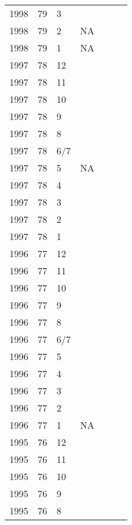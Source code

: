 \begin{longtable}{ |l|l|l|l|p{2.7cm}|l|p{2cm}| }
 1998 & 79 &     3 &         &  &  & \\
 1998 & 79 &     2 &     NA  &  &  & \\
 1998 & 79 &     1 &     NA  &  &  & \\
 1997 & 78 &    12 &         &  &  & \\
 1997 & 78 &    11 &         &  &  & \\
 1997 & 78 &    10 &         &  &  & \\
 1997 & 78 &     9 &         &  &  & \\
 1997 & 78 &     8 &         &  &  & \\
 1997 & 78 &   6/7 &         &  &  & \\
 1997 & 78 &     5 &     NA  &  &  & \\
 1997 & 78 &     4 &         &  &  & \\
 1997 & 78 &     3 &         &  &  & \\
 1997 & 78 &     2 &         &  &  & \\
 1997 & 78 &     1 &         &                &  & \\
 1996 & 77 &    12 &         &                &  & \\
 1996 & 77 &    11 &         &                &  & \\
 1996 & 77 &    10 &         &                &  & \\
 1996 & 77 &     9 &         &                &  & \\
 1996 & 77 &     8 &         &                &  & \\
 1996 & 77 &   6/7 &         &                &  & \\
 1996 & 77 &     5 &         &                &  & \\
 1996 & 77 &     4 &         &                &  & \\
 1996 & 77 &     3 &         &                &  & \\
 1996 & 77 &     2 &         &                &  & \\
 1996 & 77 &     1 &     NA  &                &  & \\
 1995 & 76 &    12 &         &                &  & \\
 1995 & 76 &    11 &         &                &  & \\
 1995 & 76 &    10 &         &                &  & \\
 1995 & 76 &     9 &         &                &  & \\
 1995 & 76 &     8 &         &                &  & \\

\end{longtable}
